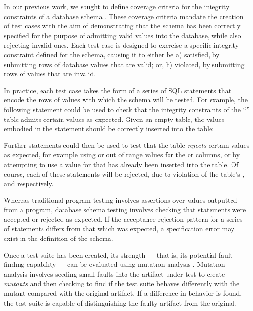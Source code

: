 In our previous work, we sought to define coverage criteria for the integrity constraints of a database schema \cite{McMinn2015}. These coverage criteria mandate the creation of test cases with the aim of demonstrating that the schema has been correctly specified for the purpose of admitting valid values into the database, while also rejecting invalid ones. Each test case is designed to exercise a specific integrity constraint defined for the schema, causing it to either be a) satisfied, by submitting rows of database values that are valid; or, b) violated, by submitting rows of values that are invalid. 

In practice, each test case takes the form of a series of SQL \INSERT statements that encode the rows of values with which the schema will be tested. For example, the following \INSERT statement could be used to check that the integrity constraints of the ``'' table admits certain values as expected. Given an empty table, the values embodied in the statement should be correctly inserted into the table:

\vspace{-.25em}
\begin{center}
\end{center}
\vspace{-.25em}

Further \INSERT statements could then be used to test that the table {\it rejects} certain values as expected, for example using \NULL or out of range values for the  or  columns, or by attempting to use a value for  that has already been inserted into the table. Of course, each of these \INSERT statements will be rejected, due to violation of the table's \NOTNULL, \CHECK and \PKCs respectively. 

Whereas traditional program testing involves assertions over values outputted from a program, database schema testing involves checking that \INSERT statements were accepted or rejected as expected. If the acceptance-rejection pattern for a series of \INSERT statements differs from that which was expected, a specification error may exist in the definition of the schema.

Once a test suite has been created, its strength --- that is, its potential fault-finding capability --- can be evaluated using mutation analysis \cite{Jia2011}. Mutation analysis involves seeding small faults into the artifact under test to create {\it mutants} and then checking to find if the test suite behaves differently with the mutant compared with the original artifact. If a difference in behavior is found, the test suite is capable of distinguishing the faulty artifact from the original.

